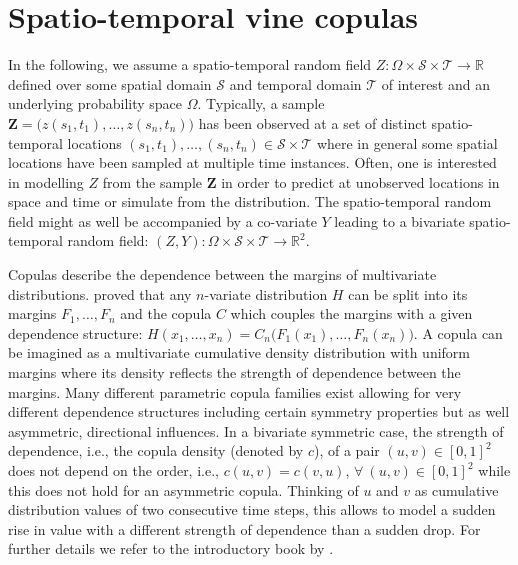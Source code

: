 \documentclass[article,nojss]{jss}
\begin{document}
\section{Spatio-temporal vine copulas}
\label{sec:stVineCop}
In the following, we assume a spatio-temporal random field $Z:\Omega \times \mathcal{S} \times \mathcal{T} \rightarrow \mathbb{R}$ defined over some spatial domain $\mathcal{S}$ and temporal domain $\mathcal{T}$ of interest and an underlying probability space $\Omega$. Typically, a sample $\mathbf{Z} = \big(z(s_1,t_1),\dots,z(s_n,t_n)\big)$ has been observed at a set of distinct spatio-temporal locations $(s_1, t_1), \dots, (s_n,t_n) \in \mathcal{S}\times \mathcal{T}$ where in general some spatial locations have been sampled at multiple time instances. Often, one is interested in modelling $Z$ from the sample $\mathbf{Z}$ in order to predict at unobserved locations in space and time or simulate from the distribution. The spatio-temporal random field might as well be accompanied by a co-variate $Y$ leading to a bivariate spatio-temporal random field: $(Z,Y):\Omega \times \mathcal{S} \times \mathcal{T} \rightarrow \mathbb{R}^2$.

Copulas describe the dependence between the margins of multivariate distributions. \citet{Sklar1959} proved that any $n$-variate distribution $H$ can be split into its margins $F_1,\dots,F_n$ and the copula $C$ which couples the margins with a given dependence structure: 
$H(x_1,\dots,x_n)=C_n\big(F_1(x_1),\dots, F_n(x_n)\big)$.
A copula can be imagined as a multivariate cumulative density distribution with uniform margins where its density reflects the strength of dependence between the margins. Many different parametric copula families exist allowing for very different dependence structures including certain symmetry properties but as well asymmetric, directional influences. In a bivariate symmetric case, the strength of dependence, i.e., the copula density (denoted by $c$), of a pair $(u,v) \in [0,1]^2$ does not depend on the order, i.e., $c(u,v)=c(v,u)$, $\forall \ (u,v) \in [0,1]^2$ while this does not hold for an asymmetric copula. Thinking of $u$ and $v$ as cumulative distribution values of two consecutive time steps, this allows to model a sudden rise in value with a different strength of dependence than a sudden drop. For further details we refer to the introductory book by \citet{Nelsen2006}.
\end{document}
